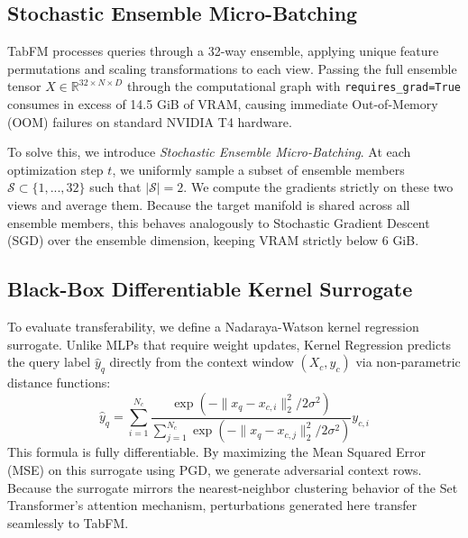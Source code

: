 \subsection{Stochastic Ensemble Micro-Batching}
TabFM processes queries through a 32-way ensemble, applying unique feature permutations and scaling transformations to each view. Passing the full ensemble tensor $X \in \mathbb{R}^{32 \times N \times D}$ through the computational graph with \texttt{requires\_grad=True} consumes in excess of 14.5 GiB of VRAM, causing immediate Out-of-Memory (OOM) failures on standard NVIDIA T4 hardware.

To solve this, we introduce \textit{Stochastic Ensemble Micro-Batching}. At each optimization step $t$, we uniformly sample a subset of ensemble members $\mathcal{S} \subset \{1, ..., 32\}$ such that $|\mathcal{S}| = 2$. We compute the gradients strictly on these two views and average them. Because the target manifold is shared across all ensemble members, this behaves analogously to Stochastic Gradient Descent (SGD) over the ensemble dimension, keeping VRAM strictly below 6 GiB.

\subsection{Black-Box Differentiable Kernel Surrogate}
To evaluate transferability, we define a Nadaraya-Watson kernel regression surrogate. Unlike MLPs that require weight updates, Kernel Regression predicts the query label $\hat{y}_q$ directly from the context window $(X_c, y_c)$ via non-parametric distance functions:
\begin{equation}
    \hat{y}_q = \sum_{i=1}^{N_c} \frac{\exp(-\|x_q - x_{c,i}\|_2^2 / 2\sigma^2)}{\sum_{j=1}^{N_c} \exp(-\|x_q - x_{c,j}\|_2^2 / 2\sigma^2)} y_{c,i}
\end{equation}
This formula is fully differentiable. By maximizing the Mean Squared Error (MSE) on this surrogate using PGD, we generate adversarial context rows. Because the surrogate mirrors the nearest-neighbor clustering behavior of the Set Transformer's attention mechanism, perturbations generated here transfer seamlessly to TabFM.

